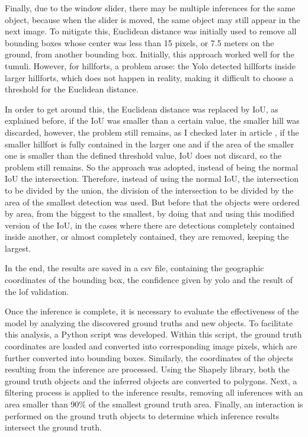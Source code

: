 Finally, due to the window slider, there may be multiple inferences for the same object, because when the slider is moved, the same object may still appear in the next image. To mitigate this, Euclidean distance was initially used to remove all bounding boxes whose center was less than 15 pixels, or 7.5 meters on the ground, from another bounding box. Initially, this approach worked well for the tumuli. However, for hillforts, a problem arose: the Yolo detected hillforts inside larger hillforts, which does not happen in reality, making it difficult to choose a threshold for the Euclidean distance. 

In order to get around this, the Euclidean distance was replaced by IoU, as explained before, if the IoU was smaller than a certain value, the smaller hill was discarded, however, the problem still remains, as I checked later in article \cite{IOUpaper}, if the smaller hillfort is fully contained in the larger one and if the area of the smaller one is smaller than the defined threshold value, IoU does not discard, so the problem still remains. So the approach was adopted, instead of being the normal IoU the intersection. Therefore, instead of using the normal IoU, the intersection to be divided by the union, the division of the intersection to be divided by the area of the smallest detection was used. But before that the objects were ordered by area, from the biggest to the smallest, by doing that and using this modified version of the IoU, in the cases where there are detections completely contained inside another, or almost completely contained, they are removed, keeping the largest.

In the end, the results are saved in a csv file, containing the geographic coordinates of the bounding box, the confidence given by \ac{yolo} and the result of the \ac{lof} validation.

Once the inference is complete, it is necessary to evaluate the effectiveness of the model by analyzing the discovered ground truths and new objects. To facilitate this analysis, a Python script was developed. Within this script, the ground truth coordinates are loaded and converted into corresponding image pixels, which are further converted into bounding boxes. Similarly, the coordinates of the objects resulting from the inference are processed. Using the Shapely library, both the ground truth objects and the inferred objects are converted to polygons. Next, a filtering process is applied to the inference results, removing all inferences with an area smaller than 90\% of the smallest ground truth area. Finally, an interaction is performed on the ground truth objects to determine which inference results intersect the ground truth.

